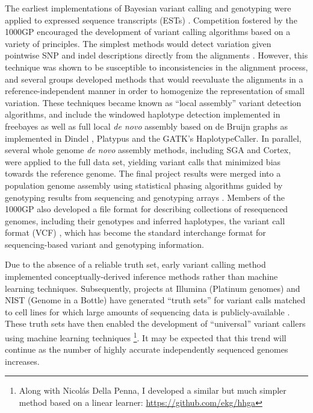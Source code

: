 \documentclass[a4paper,12pt,numbered,oneside]{Classes/PhDThesisPSnPDF}
\begin{document}
The earliest implementations of Bayesian variant calling and genotyping were applied to expressed sequence transcripts (ESTs) \cite{marth1999general}.
Competition fostered by the 1000GP encouraged the development of variant calling algorithms based on a variety of principles.
The simplest methods would detect variation given pointwise SNP and indel descriptions directly from the alignments \cite{li2009sequence,depristo2011framework}.
However, this technique was shown to be susceptible to inconsistencies in the alignment process, and several groups developed methods that would reevaluate the alignments in a reference-independent manner in order to homogenize the representation of small variation.
These techniques became known as ``local assembly'' variant detection algorithms, and include the windowed haplotype detection implemented in freebayes \cite{garrison2012haplotype} as well as full local \emph{de novo} assembly based on de Bruijn graphs as implemented in Dindel \cite{albers2010dindel}, Platypus \cite{rimmer2014integrating} and the GATK's HaplotypeCaller.
In parallel, several whole genome \emph{de novo} assembly methods, including SGA and Cortex, were applied to the full data set, yielding variant calls that minimized bias towards the reference genome.
The final project results were merged into a population genome assembly using statistical phasing algorithms \cite{browning2007,howie2011,delaneau2012} guided by genotyping results from sequencing and genotyping arrays \cite{1000g2015}.
Members of the 1000GP also developed a file format for describing collections of resequenced genomes, including their genotypes and inferred haplotypes, the variant call format (VCF) \cite{danecek2011variant}, which has become the standard interchange format for sequencing-based variant and genotyping information.

Due to the absence of a reliable truth set, early variant calling method implemented conceptually-derived inference methods rather than machine learning techniques.
Subsequently, projects at Illumina (Platinum genomes) and NIST (Genome in a Bottle) have generated ``truth sets'' for variant calls matched to cell lines for which large amounts of sequencing data is publicly-available \cite{eberle2013platinum,zook2014integrating}.
These truth sets have then enabled the development of ``universal'' variant callers using machine learning techniques \cite{poplin2017creating}\footnote{Along with Nicol\'{a}s Della Penna, I developed a similar but much simpler method based on a linear learner: \url{https://github.com/ekg/hhga}}.
It may be expected that this trend will continue as the number of highly accurate independently sequenced genomes increases.
\end{document}
